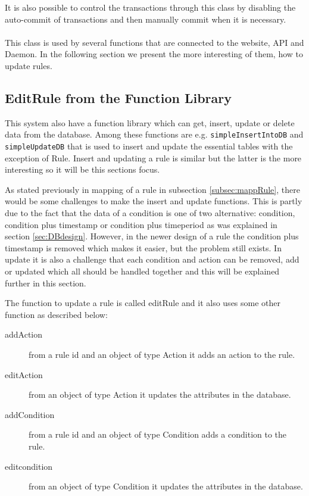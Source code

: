 It is also possible to control the transactions through this class by disabling the auto-commit of transactions and then manually commit when it is necessary. \\\\

This class is used by several functions that are connected to the website, API and Daemon. In the following section we present the more interesting of them, how to update rules. 

\subsection{EditRule from the Function Library}
\label{subsec:dbRule}
This system also have a function library which can get, insert, update or delete data from the database. Among these functions are e.g. \texttt{simpleInsertIntoDB} and \texttt{simpleUpdateDB} that is used to insert and update the essential tables with the exception of Rule. Insert and updating a rule is similar but the latter is the more interesting so it will be this sections focus. 

As stated previously in mapping of a rule in subsection \vref{subsec:mappRule}, there would be some challenges to make the insert and update functions. This is partly due to the fact that the data of a condition  is one of two alternative: condition, condition plus timestamp  or condition plus timeperiod as was explained in section \vref{sec:DBdesign}. However, in the newer design of a rule the condition plus timestamp is removed which makes it easier, but the problem still exists. In update it is also a challenge that each condition and action can be removed, add or updated which all should be handled together and this will be explained further in this section. 

The function to update a rule is called editRule and it also uses some other function as described below:

\begin{description}
	\item[addAction] from a rule id and an object of type Action it adds an action to the rule.
	\item[editAction] from an object of type Action it updates the attributes in the database.   
	\item[addCondition] from a rule id and an object of type Condition adds a condition to the rule.
	\item[editcondition] from an object of type Condition it updates the attributes in the database.   
\end{description}

